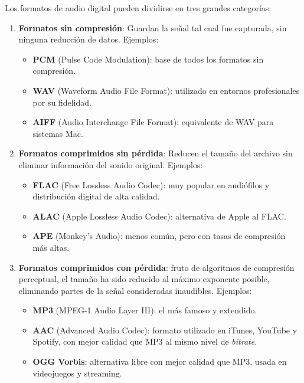 Los formatos de audio digital pueden dividirse en tres grandes categorías:

\begin{enumerate}
    \item \textbf{Formatos sin compresión}: Guardan la señal tal cual fue capturada, sin ninguna reducción de datos. Ejemplos:
    \begin{itemize}
        \item \textbf{PCM} (Pulse Code Modulation): base de todos los formatos sin compresión.
        \item \textbf{WAV} (Waveform Audio File Format): utilizado en entornos profesionales por su fidelidad.
        \item \textbf{AIFF} (Audio Interchange File Format): equivalente de WAV para sistemas Mac.
    \end{itemize}
    
    \item \textbf{Formatos comprimidos sin pérdida}: Reducen el tamaño del archivo sin eliminar información del sonido original. Ejemplos:
    \begin{itemize}
        \item \textbf{FLAC} (Free Lossless Audio Codec): muy popular en audiófilos y distribución digital de alta calidad.
        \item \textbf{ALAC} (Apple Lossless Audio Codec): alternativa de Apple al FLAC.
        \item \textbf{APE} (Monkey’s Audio): menos común, pero con tasas de compresión más altas.
    \end{itemize}

    \item \textbf{Formatos comprimidos con pérdida}: fruto de algoritmos de compresión perceptual, el tamaño ha sido reducido al máximo exponente posible, eliminando partes de la señal consideradas inaudibles. Ejemplos:
    \begin{itemize}
        \item \textbf{MP3} (MPEG-1 Audio Layer III): el más famoso y extendido.
        \item \textbf{AAC} (Advanced Audio Codec): formato utilizado en iTunes, YouTube y Spotify, con mejor calidad que MP3 al mismo nivel de \emph{bitrate}.
        \item \textbf{OGG Vorbis}: alternativa libre con mejor calidad que MP3, usada en videojuegos y streaming.
    \end{itemize}
\end{enumerate}

